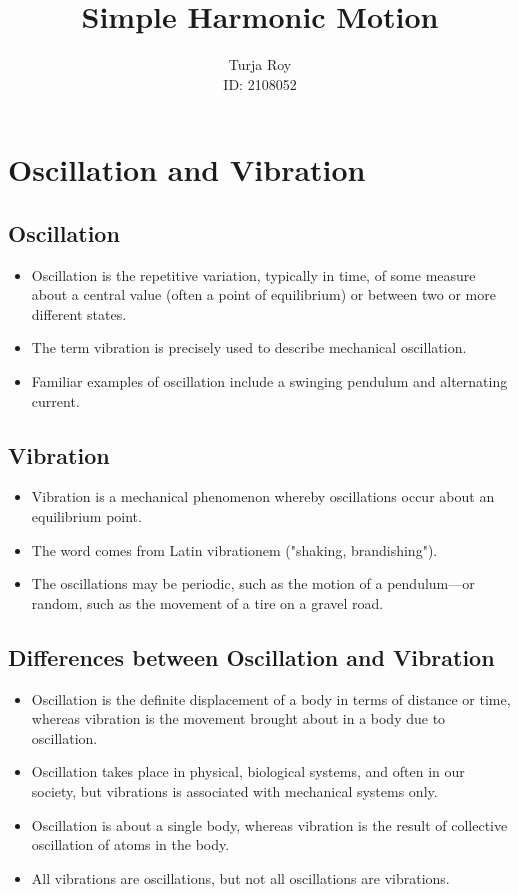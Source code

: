 \documentclass[12pt]{article}
\title{
    \textbf{Simple Harmonic Motion}
}
\author{
    Turja Roy\\
    ID: 2108052
}
\date{}
\begin{document}
\maketitle
\tableofcontents
\newpage

\section{Oscillation and Vibration}
\subsection{Oscillation}
\begin{itemize}
    \item Oscillation is the repetitive variation, typically in time, of some measure about a central value (often a point of equilibrium) or between two or more different states.
    \item The term vibration is precisely used to describe mechanical oscillation.
    \item Familiar examples of oscillation include a swinging pendulum and alternating current.
\end{itemize}

\subsection{Vibration}
\begin{itemize}
    \item Vibration is a mechanical phenomenon whereby oscillations occur about an equilibrium point.
    \item The word comes from Latin vibrationem ("shaking, brandishing").
    \item The oscillations may be periodic, such as the motion of a pendulum—or random, such as the movement of a tire on a gravel road.
\end{itemize}

\subsection{Differences between Oscillation and Vibration}
\begin{itemize}
    \item Oscillation is the definite displacement of a body in terms of distance or time, whereas vibration is the movement brought about in a body due to oscillation.
    \item Oscillation takes place in physical, biological systems, and often in our society, but vibrations is associated with mechanical systems only.
    \item Oscillation is about a single body, whereas vibration is the result of collective oscillation of atoms in the body.
    \item All vibrations are oscillations, but not all oscillations are vibrations.
\end{itemize}
\end{document}
